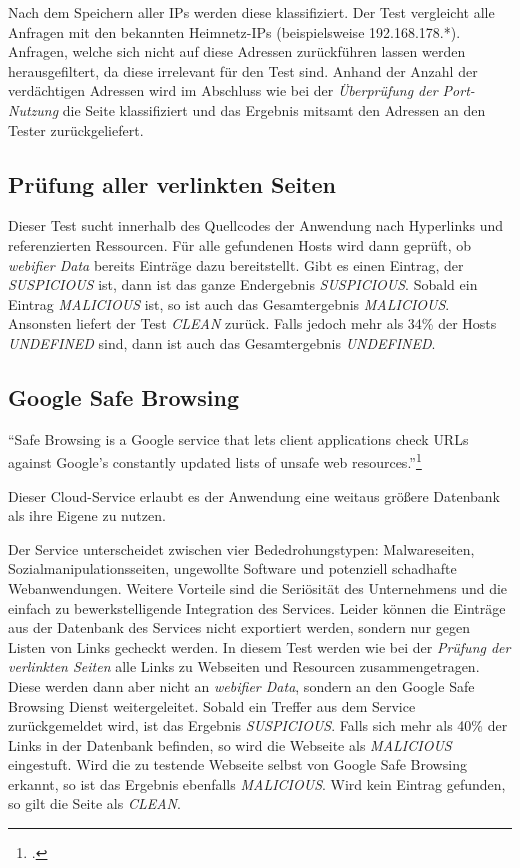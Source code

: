 Nach dem Speichern aller IPs werden diese klassifiziert. Der Test vergleicht alle Anfragen mit den
bekannten Heimnetz-IPs (beispielsweise 192.168.178.*). Anfragen, welche sich nicht auf diese
Adressen zurückführen lassen werden herausgefiltert, da diese irrelevant für den Test sind. Anhand
der Anzahl der verdächtigen Adressen wird im Abschluss wie bei der \textit{Überprüfung der
Port-Nutzung} die Seite klassifiziert und das Ergebnis mitsamt den Adressen an den
Tester zurückgeliefert.

\subsection{Prüfung aller verlinkten Seiten}
\label{sec:konzept-linkchecker}

Dieser Test sucht innerhalb des Quellcodes der Anwendung nach Hyperlinks und referenzierten Ressourcen.
Für alle gefundenen Hosts wird dann geprüft, ob \textit{webifier Data} bereits Einträge dazu
bereitstellt.
Gibt es einen Eintrag, der \textit{SUSPICIOUS} ist, dann ist das ganze Endergebnis \textit{SUSPICIOUS}.
Sobald ein Eintrag \textit{MALICIOUS} ist, so ist auch das Gesamtergebnis \textit{MALICIOUS}.
Ansonsten liefert der Test \textit{CLEAN} zurück. Falls jedoch mehr als 34\% der Hosts
\textit{UNDEFINED} sind, dann ist auch das Gesamtergebnis \textit{UNDEFINED}.

\subsection{Google Safe Browsing}

\begin{center}
	\enquote{Safe Browsing is a Google service that lets client applications check \acsp{URL} against
	Google's constantly updated lists of unsafe web resources.}\footcite[Vgl.][]{googleSafeBrowsing}
\end{center}

Dieser Cloud-Service erlaubt es der Anwendung eine weitaus größere Datenbank als ihre Eigene zu
nutzen.

Der Service unterscheidet zwischen vier Bededrohungstypen\label{par:konzep-gsb-types}: Malwareseiten, Sozialmanipulationsseiten, ungewollte Software und potenziell schadhafte Webanwendungen.
Weitere Vorteile sind die Seriösität des Unternehmens und die einfach zu bewerkstelligende
Integration des Services.
Leider können die Einträge aus der Datenbank des Services nicht exportiert werden, sondern nur gegen Listen von Links gecheckt werden.
In diesem Test werden wie bei der \textit{Prüfung der verlinkten Seiten} alle Links zu Webseiten und
Resourcen zusammengetragen.
Diese werden dann aber nicht an \textit{webifier Data}, sondern an den Google Safe Browsing Dienst
weitergeleitet.
Sobald ein Treffer aus dem Service zurückgemeldet wird, ist das Ergebnis \textit{SUSPICIOUS}.
Falls sich mehr als 40\% der Links in der Datenbank befinden, so wird die Webseite als
\textit{MALICIOUS} eingestuft.
Wird die zu testende Webseite selbst von Google Safe Browsing erkannt, so ist das Ergebnis ebenfalls
\textit{MALICIOUS}.
Wird kein Eintrag gefunden, so gilt die Seite als \textit{CLEAN}.

